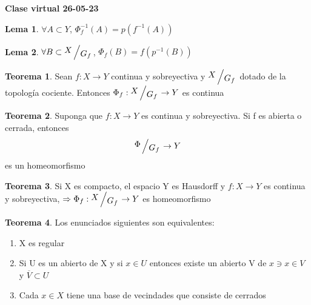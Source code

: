 \documentclass{article}
\theoremstyle{definition}
\newtheorem{theorem}{Teorema}[section]
\newtheorem{lemma}{Lema}[section]
\newcommand{\bigslant}[2]{{\raisebox{.2em}{$#1$}\left/\raisebox{-.2em}{$#2$}\right.}}
\begin{document}
\textbf{Clase virtual 26-05-23}
\begin{lemma}
	$\forall A\subset Y$, $\Phi_f^{-1}(A)=p(f^{-1}(A))$
\end{lemma}
\begin{lemma}
	$\forall B\subset \bigslant{X}{G_f}$, $\Phi_f(B)=f(p^{-1}(B))$
\end{lemma}
\begin{theorem}
	Sean $f:X\to Y$ continua y sobreyectiva y  $\bigslant{X}{G_f}$ dotado de la topología cociente. Entonces $\Phi_f:\bigslant{X}{G_f}\to Y$ es continua
\end{theorem}
\begin{theorem}
	Suponga que $f:X\to Y$ es continua y sobreyectiva. Si f es abierta o cerrada, entonces 
	\[ \bigslant{\Phi}{G_f}\to Y\]
	es un homeomorfismo
\end{theorem}
\begin{theorem}

	Si X es compacto, el espacio Y es Hausdorff y $f:X\to Y$ es continua y sobreyectiva, $\Rightarrow \Phi_f:\bigslant{X}{G_f}\to Y$ es homeomorfismo
\end{theorem}
\begin{theorem}
	Los enunciados siguientes son equivalentes:
	\begin{enumerate}
		\item X es regular
		\item Si U es un abierto de X y si $x\in U$ entonces existe un abierto V de $x\ni x\in V$ y $\overline{V}\subset U$
		\item Cada $x\in X$ tiene una base de vecindades que consiste de cerrados
	\end{enumerate}
\end{theorem}
\end{document}
